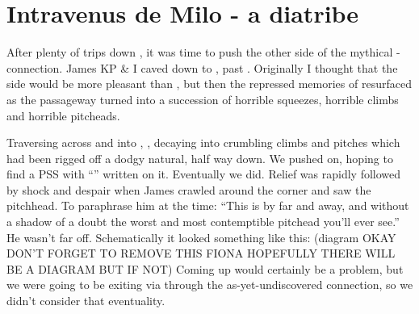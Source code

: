 \section{Intravenus de Milo - a diatribe}


After plenty of trips down , it was time to push the other side
of the mythical - connection. James KP
\& I caved down to , past . Originally I thought that the  side
would be more pleasant than , but then the repressed memories
of  resurfaced as the passageway turned into a
succession of horrible squeezes, horrible climbs and horrible pitcheads.



Traversing across  and into , , decaying into crumbling climbs and pitches
which had been rigged off a dodgy natural, half way down. We pushed on,
hoping to find a PSS with ``'' written on it.
Eventually we did. Relief was rapidly followed by shock and despair when
James crawled around the corner and saw the 
pitchhead. To paraphrase him at the time: ``This is by far and away, and
without a shadow of a doubt the worst and most contemptible pitchead
you'll ever see.'' He wasn't far off. Schematically it looked something
like this: (diagram OKAY DON'T FORGET TO REMOVE THIS FIONA HOPEFULLY THERE WILL BE A DIAGRAM BUT IF NOT) Coming up would certainly be a problem, but we were
going to be exiting via  through the as-yet-undiscovered
connection, so we didn't consider that eventuality.

